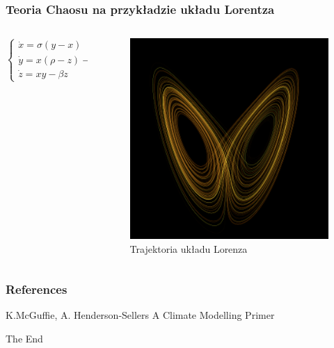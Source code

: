 \documentclass{beamer}
\begin{document}
\begin{frame}
	\frametitle{Teoria Chaosu na przykładzie układu Lorentza}
	\begin{columns}
	\begin{column}{0.5\textwidth}	
		$\begin{cases} \dot{x} = \sigma(y-x)\\ \dot{y} =x(\rho-z)-y \\ \dot{z} = xy-\beta z \end{cases}$
	\end{column}
	\begin{column}{0.5\textwidth}
			\begin{figure}[h]
		\begin{center}
			\includegraphics[width=0.7\linewidth]{images/motyl.png}
			\caption{Trajektoria układu Lorenza}
		\end{center}
	\end{figure}
	\end{column}

	\end{columns}


	
\end{frame}





\begin{frame}
\frametitle{References}
\footnotesize{
\begin{thebibliography}{99} %
 K.McGuffie, A. Henderson-Sellers
\newblock A Climate Modelling Primer

\end{thebibliography}
}
\end{frame}


\begin{frame}
\Huge{\centerline{The End}}
\end{frame}
\end{document}
